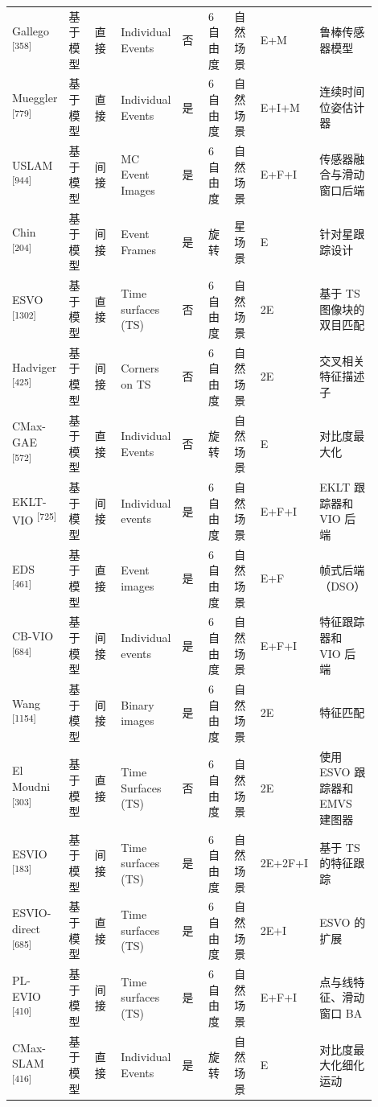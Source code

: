 \begin{longtable}{p{0.100\linewidth}p{0.100\linewidth}p{0.100\linewidth}p{0.100\linewidth}p{0.100\linewidth}p{0.100\linewidth}p{0.100\linewidth}p{0.100\linewidth}p{0.100\linewidth}}
Gallego \textsuperscript{[358]} & 基于模型 & 直接 & Individual Events & 否 & 6 自由度 & 自然场景 & E+M & 鲁棒传感器模型 \\
Mueggler \textsuperscript{[779]} & 基于模型 & 直接 & Individual Events & 是 & 6 自由度 & 自然场景 & E+I+M & 连续时间位姿估计器 \\
USLAM \textsuperscript{[944]} & 基于模型 & 间接 & MC Event Images & 是 & 6 自由度 & 自然场景 & E+F+I & 传感器融合与滑动窗口后端 \\
Chin \textsuperscript{[204]} & 基于模型 & 间接 & Event Frames & 是 & 旋转 & 星场景 & E & 针对星跟踪设计 \\
ESVO \textsuperscript{[1302]} & 基于模型 & 直接 & Time surfaces (TS) & 否 & 6 自由度 & 自然场景 & 2E & 基于 TS 图像块的双目匹配 \\
Hadviger \textsuperscript{[425]} & 基于模型 & 间接 & Corners on TS & 否 & 6 自由度 & 自然场景 & 2E & 交叉相关特征描述子 \\
CMax-GAE \textsuperscript{[572]} & 基于模型 & 直接 & Individual Events & 否 & 旋转 & 自然场景 & E & 对比度最大化 \\
EKLT-VIO \textsuperscript{[725]} & 基于模型 & 间接 & Individual events & 是 & 6 自由度 & 自然场景 & E+F+I & EKLT 跟踪器和 VIO 后端 \\
EDS \textsuperscript{[461]} & 基于模型 & 直接 & Event images & 是 & 6 自由度 & 自然场景 & E+F & 帧式后端（DSO） \\
CB-VIO \textsuperscript{[684]} & 基于模型 & 间接 & Individual events & 是 & 6 自由度 & 自然场景 & E+F+I & 特征跟踪器和 VIO 后端 \\
Wang \textsuperscript{[1154]} & 基于模型 & 间接 & Binary images & 是 & 6 自由度 & 自然场景 & 2E & 特征匹配 \\
El Moudni \textsuperscript{[303]} & 基于模型 & 直接 & Time Surfaces (TS) & 否 & 6 自由度 & 自然场景 & 2E & 使用 ESVO 跟踪器和 EMVS 建图器 \\
ESVIO \textsuperscript{[183]} & 基于模型 & 间接 & Time surfaces (TS) & 是 & 6 自由度 & 自然场景 & 2E+2F+I & 基于 TS 的特征跟踪 \\
ESVIO-direct \textsuperscript{[685]} & 基于模型 & 直接 & Time surfaces (TS) & 是 & 6 自由度 & 自然场景 & 2E+I & ESVO 的扩展 \\
PL-EVIO \textsuperscript{[410]} & 基于模型 & 间接 & Time surfaces (TS) & 是 & 6 自由度 & 自然场景 & E+F+I & 点与线特征、滑动窗口 BA \\
CMax-SLAM \textsuperscript{[416]} & 基于模型 & 直接 & Individual Events & 是 & 旋转 & 自然场景 & E & 对比度最大化细化运动 \\

\end{longtable}
